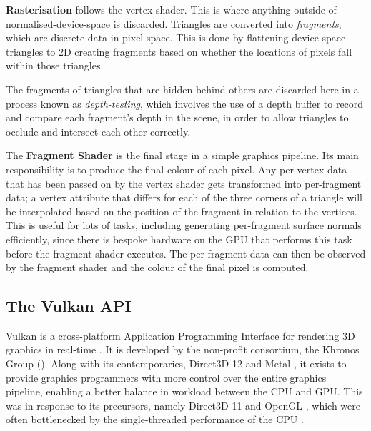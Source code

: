 \documentclass[11pt, a4paper, twocolumn]{article}
\begin{document}
\textbf{Rasterisation} follows the vertex shader. This is where anything outside of normalised-device-space is discarded. Triangles are converted into \emph{fragments}, which are discrete data in pixel-space. This is done by flattening device-space triangles to 2D creating fragments based on whether the locations of pixels fall within those triangles.

The fragments of triangles that are hidden behind others are discarded here in a process known as \emph{depth-testing}, which involves the use of a depth buffer to record and compare each fragment's depth in the scene, in order to allow triangles to occlude and intersect each other correctly.

The \textbf{Fragment Shader} is the final stage in a simple graphics pipeline. Its main responsibility is to produce the final colour of each pixel. Any per-vertex data that has been passed on by the vertex shader gets transformed into per-fragment data; a vertex attribute that differs for each of the three corners of a triangle will be interpolated based on the position of the fragment in relation to the vertices. This is useful for lots of tasks, including generating per-fragment surface normals efficiently, since there is bespoke hardware on the GPU that performs this task before the fragment shader executes. The per-fragment data can then be observed by the fragment shader and the colour of the final pixel is computed.


\subsection{The Vulkan API}

Vulkan is a cross-platform Application Programming Interface for rendering 3D graphics in real-time \citep{Vulkan}. It is developed by the non-profit consortium, the Khronos Group (\citeyear{Khronos}). Along with its contemporaries, Direct3D 12 \citep{d3D12} and Metal \citep{AppleMetal}, it exists to provide graphics programmers with more control over the entire graphics pipeline, enabling a better balance in workload between the CPU and GPU. This was in response to its precursors, namely Direct3D 11 \citep{d3D11} and OpenGL \citep{OpenGLDocs}, which were often bottlenecked by the single-threaded performance of the CPU \citep{CpuBottleneck}.

\end{document}

